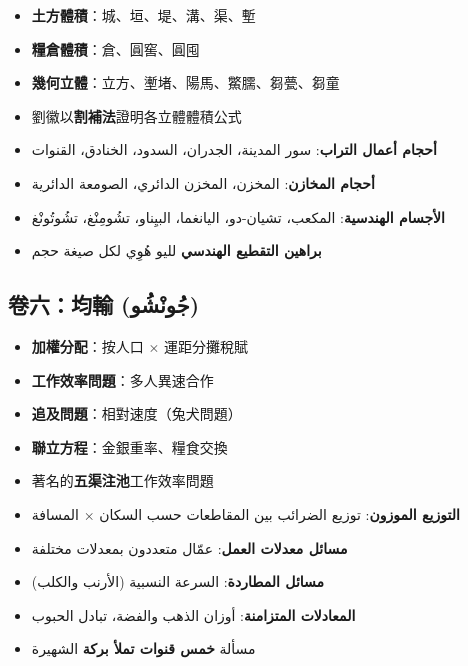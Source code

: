 \documentclass[11pt,a4paper]{article}
\begin{document}
\noindent
\begin{minipage}[t]{0.48\textwidth}
\begin{itemize}[leftmargin=1.2em,topsep=1pt,itemsep=1pt]
  \item \textbf{土方體積}：城、垣、堤、溝、渠、塹
  \item \textbf{糧倉體積}：倉、圓窖、圓囤
  \item \textbf{幾何立體}：立方、壍堵、陽馬、鱉臑、芻甍、芻童
  \item 劉徽以\textbf{割補法}證明各立體體積公式
\end{itemize}
\end{minipage}
\hfill
\begin{minipage}[t]{0.48\textwidth}
\arabicfont\beginR
\begin{itemize}[leftmargin=1.2em,topsep=1pt,itemsep=1pt]
  \item \textbf{أحجام أعمال التراب}: سور المدينة، الجدران، السدود، الخنادق، القنوات
  \item \textbf{أحجام المخازن}: المخزن، المخزن الدائري، الصومعة الدائرية
  \item \textbf{الأجسام الهندسية}: المكعب، تشيان-دو، اليانغما، البيِناو، تشُومِنْغ، تشُوتُونْغ
  \item \textbf{براهين التقطيع الهندسي} لليو هُوِي لكل صيغة حجم
\end{itemize}
\endR
\end{minipage}

\subsection*{卷六：均輸 (جُونْشُو)}

\noindent
\begin{minipage}[t]{0.48\textwidth}
\begin{itemize}[leftmargin=1.2em,topsep=1pt,itemsep=1pt]
  \item \textbf{加權分配}：按人口 $\times$ 運距分攤稅賦
  \item \textbf{工作效率問題}：多人異速合作
  \item \textbf{追及問題}：相對速度（兔犬問題）
  \item \textbf{聯立方程}：金銀重率、糧食交換
  \item 著名的\textbf{五渠注池}工作效率問題
\end{itemize}
\end{minipage}
\hfill
\begin{minipage}[t]{0.48\textwidth}
\arabicfont\beginR
\begin{itemize}[leftmargin=1.2em,topsep=1pt,itemsep=1pt]
  \item \textbf{التوزيع الموزون}: توزيع الضرائب بين المقاطعات حسب السكان $\times$ المسافة
  \item \textbf{مسائل معدلات العمل}: عمّال متعددون بمعدلات مختلفة
  \item \textbf{مسائل المطاردة}: السرعة النسبية (الأرنب والكلب)
  \item \textbf{المعادلات المتزامنة}: أوزان الذهب والفضة، تبادل الحبوب
  \item مسألة \textbf{خمس قنوات تملأ بركة} الشهيرة
\end{itemize}
\endR
\end{minipage}
\end{document}
